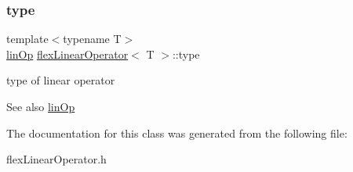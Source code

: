 \subsubsection{\texorpdfstring{type}{type}}
{\footnotesize\ttfamily template$<$typename T$>$ \\
\hyperlink{tools_8h_a3fc67a2f9370c09fecbd90da67687d36}{lin\+Op} \hyperlink{classflex_linear_operator}{flex\+Linear\+Operator}$<$ T $>$\+::type}



type of linear operator 

\begin{DoxySeeAlso}{See also}
\hyperlink{tools_8h_a3fc67a2f9370c09fecbd90da67687d36}{lin\+Op} 
\end{DoxySeeAlso}


The documentation for this class was generated from the following file\+:\begin{DoxyCompactItemize}
\item 
flex\+Linear\+Operator.\+h\end{DoxyCompactItemize}

